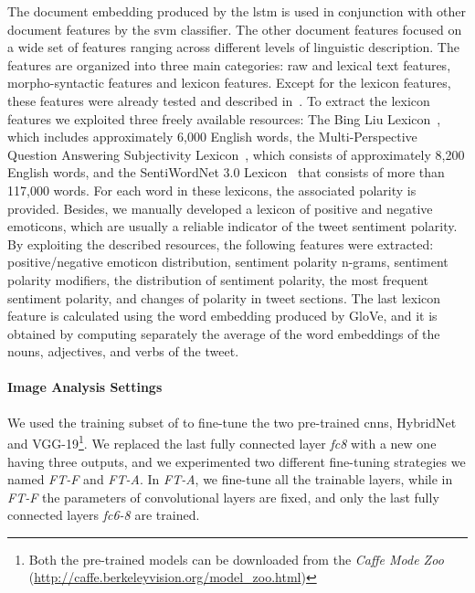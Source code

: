 The document embedding produced by the \gls{lstm} is used in conjunction with other document features by the \gls{svm} classifier.
The other document features focused on a wide set of features ranging across different levels of linguistic description.
The features are organized into three main categories: raw and lexical text features, morpho-syntactic features and lexicon features.
Except for the lexicon features, these features were already tested and described in~\cite{cimino2016tandem}.
To extract the lexicon features we exploited three freely available resources: The Bing Liu Lexicon~\cite{hu2004mining}, which includes approximately 6,000 English words, the Multi-Perspective Question Answering Subjectivity Lexicon~\cite{wilson2005recognizing}, which consists of approximately 8,200 English words, and the SentiWordNet 3.0 Lexicon~\cite{baccianella2010sentiwordnet} that consists of more than 117,000 words.
For each word in these lexicons, the associated polarity is provided.
Besides, we manually developed a lexicon of positive and negative emoticons, which are usually a reliable indicator of the tweet sentiment polarity.
By exploiting the described resources, the following features were extracted: positive/negative emoticon distribution, sentiment polarity n-grams, sentiment polarity modifiers, the distribution of sentiment polarity, the most frequent sentiment polarity, and changes of polarity in tweet sections.
The last lexicon feature is calculated using the word embedding produced by GloVe, and it is obtained by computing separately the average of the word embeddings of the nouns, adjectives, and verbs of the tweet.

\paragraph{Image Analysis Settings}
We used the training subset of \BTSA{} to fine-tune the two pre-trained \glspl{cnn}, HybridNet and VGG-19\footnote{Both the pre-trained models can be downloaded from the \emph{Caffe Mode Zoo} (\url{http://caffe.berkeleyvision.org/model_zoo.html})}.
We replaced the last fully connected layer \emph{fc8} with a new one having three outputs, and we experimented two different fine-tuning strategies we named \emph{FT-F} and \emph{FT-A}.
In \emph{FT-A}, we fine-tune all the trainable layers, while in \emph{FT-F} the parameters of convolutional layers are fixed, and only the last fully connected layers \emph{fc6-8} are trained.

